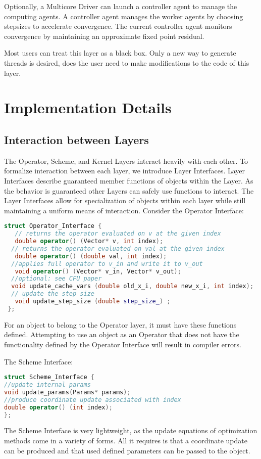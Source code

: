 Optionally, a Multicore Driver can launch a controller agent to manage the computing agents.
A controller agent manages the worker agents by choosing stepsizes to accelerate convergence.
The current controller agent monitors convergence by maintaining an approximate fixed point residual.

Most users can treat this layer as a black box. Only a new way to generate threads is desired, does the user need to make modifications to the code of this layer.

\section{Implementation Details}

\subsection{Interaction between Layers}

The Operator, Scheme, and Kernel Layers interact heavily with each other. To formalize interaction between each layer, we introduce Layer Interfaces. Layer Interfaces describe guaranteed member functions of objects within the Layer. As the behavior is guaranteed other Layers can safely use functions to interact. The Layer Interfaces allow for specialization of objects within each layer while still maintaining a uniform means of interaction. Consider the Operator Interface:
\begin{lstlisting}[language=C++,label={Operator_Interface}]
struct Operator_Interface {
   // returns the operator evaluated on v at the given index
   double operator() (Vector* v, int index);
  // returns the operator evaluated on val at the given index
   double operator() (double val, int index);
  //applies full operator to v_in and write it to v_out
   void operator() (Vector* v_in, Vector* v_out);
  //optional: see CFU paper
  void update_cache_vars (double old_x_i, double new_x_i, int index);
  // update the step size
   void update_step_size (double step_size_) ;
 };
\end{lstlisting}

For an object to belong to the Operator layer, it must have these functions defined.
Attempting to use an object as an Operator that does not have the functionality defined by the Operator Interface will result in compiler errors.

The Scheme Interface:
\begin{lstlisting}[language=C++]
struct Scheme_Interface {
//update internal params
void update_params(Params* params);
//produce coordinate update associated with index
double operator() (int index);
};
\end{lstlisting}
The Scheme Interface is very lightweight, as the update equations of optimization methods come in a variety of forms. All it requires is that a coordinate update can be produced and that used defined parameters can be passed to the object.

